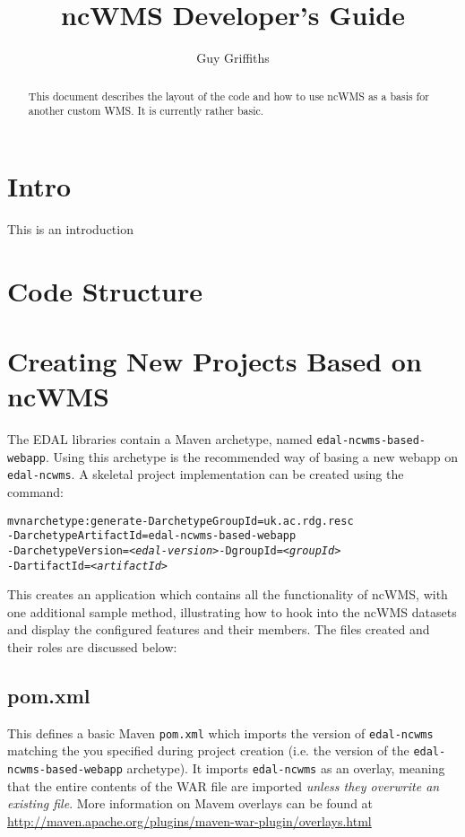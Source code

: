 \documentclass[a4paper]{article}
\title{ncWMS Developer's Guide}
\author{Guy Griffiths}
\begin{document}
\maketitle

\begin{abstract}
This document describes the layout of the code and how to use ncWMS as a basis
for another custom WMS.  It is currently rather basic.
\end{abstract}


\newpage

\section{Intro}
This is an introduction

\section{Code Structure}


\section{Creating New Projects Based on ncWMS}
The EDAL libraries contain a Maven archetype, named
{\tt edal-ncwms-based-webapp}.  Using this archetype is the recommended
way of basing a new webapp on {\tt edal-ncwms}.  A skeletal project
implementation can be created using the command:
\begin{alltt}
mvn archetype:generate -DarchetypeGroupId=uk.ac.rdg.resc
-DarchetypeArtifactId=edal-ncwms-based-webapp
-DarchetypeVersion=\emph{<edal-version>} -DgroupId=\emph{<groupId>}
-DartifactId=\emph{<artifactId>}
\end{alltt}
This creates an application which contains all the functionality of ncWMS, with
one additional sample method, illustrating how to hook into the ncWMS datasets
and display the configured features and their members.  The files created and
their roles are discussed below:

\subsection{pom.xml}
This defines a basic Maven {\tt pom.xml} which imports the
version of {\tt edal-ncwms} matching the {\tt <edal-version>} you specified
during project creation (i.e. the version of the {\tt edal-ncwms-based-webapp}
archetype).  It imports {\tt edal-ncwms} as an overlay, meaning that the entire
contents of the WAR file are imported \emph{unless they overwrite an existing
file}.  More information on Mavem overlays can be found at
\url{http://maven.apache.org/plugins/maven-war-plugin/overlays.html}
  
\end{document}
